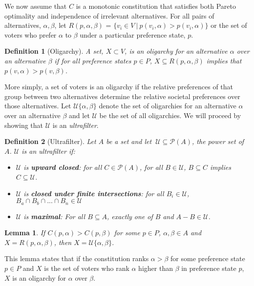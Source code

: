 \documentclass{amsart}
\newtheorem{definition}{Definition}
\newtheorem{lemma}{Lemma}
\theoremstyle{plain}
\begin{document}
 We now assume that $C$ is a monotonic constitution that satisfies both Pareto optimality and independence of irrelevant alternatives. For all pairs of alternatives, $\alpha, \beta$, let $R(p, \alpha, \beta)$ = $\{v_i \in V \: | \: p(v_i, \alpha) >  p(v_i, \alpha)\}$ or the set of voters who prefer $\alpha$ to $\beta$ under a particular preference state, $p$.

\begin{definition} [Oligarchy]
    A set, $X \subset V$, is an oligarchy for an alternative $\alpha$ over an alternative $\beta$ if for all preference states $p \in P$, $X \subseteq R(p, \alpha, \beta)$ implies that $p(v, \alpha) > p(v, \beta)$.
\end{definition}

More simply, a set of voters is an oligarchy if the relative preferences of that group between two alternatives determine the relative societal preferences over those alternatives. Let $\mathcal{U}\{\alpha,\beta\}$ denote the set of oligarchies for an alternative $\alpha$ over an alternative $\beta$ and let $\mathcal{U}$ be the set of all oligarchies. We will proceed by showing that $\mathcal{U}$ is an \emph{ultrafilter}.

\begin{definition} [Ultrafilter]
    Let $A$ be a set and let $\: \mathcal{U} \subseteq \mathcal{P}(A)$, the power set of $A$. $\mathcal{U}$ is an \emph{ultrafilter} if:

    \begin{itemize}
        \item $\mathcal{U}$ is \textbf{upward closed}: for all $C \in \mathcal{P}(A)$, for all $B 
        \in \mathcal{U}$, $B \subseteq C$ implies $C \subseteq \mathcal{U}$.
        \item $\mathcal{U}$ is \textbf{closed under finite intersections}: for all $B_i \in \mathcal{U}$, $B_a \cap B_b \cap ... \cap B_n \in \mathcal{U}$
        \item $\mathcal{U}$ is \textbf{maximal}: For all $B \subseteq A$, exactly one of $B$ and $A - B \in \mathcal{U}$.
    \end{itemize}
\end{definition}

\begin{lemma}
    If $C(p, \alpha) > C(p, \beta)$ for some $p \in P$, $\alpha, \beta \in A$ and $X = R(p, \alpha, \beta)$, then $X = \mathcal{U}\{\alpha, \beta\}$.
\end{lemma}

\noindent This lemma states that if the constitution ranks $\alpha > \beta$ for some preference state $p \in P$ and $X$ is the set of voters who rank $\alpha$ higher than $\beta$ in preference state $p$, $X$ is an oligarchy for $\alpha$ over $\beta$.
\end{document}
